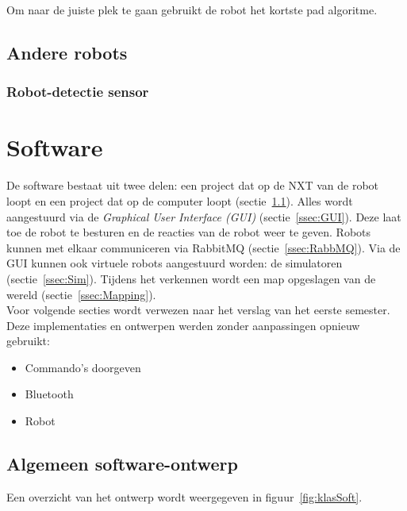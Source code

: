 \documentclass[tt3]{penoverslag}
\begin{document}
Om naar de juiste plek te gaan gebruikt de robot het kortste pad algoritme.

\subsection{Andere robots}
\subsubsection{Robot-detectie sensor}
\label{ssec:AlgoCollision}


\section{Software}
\label{sec:Softw}
De software bestaat uit twee delen: een project dat op de NXT van de robot loopt en een project dat op de computer loopt (sectie~\ref{ssec:Sdesign}). Alles wordt aangestuurd via de \textit{Graphical User Interface (GUI)} (sectie~\ref{ssec:GUI}). Deze laat toe de robot te besturen en de reacties van de robot weer te geven. Robots kunnen met elkaar communiceren via RabbitMQ (sectie~\ref{ssec:RabbMQ}). Via de GUI kunnen ook virtuele robots aangestuurd worden: de simulatoren (sectie~\ref{ssec:Sim}). Tijdens het verkennen wordt een map opgeslagen van de wereld (sectie~\ref{ssec:Mapping}).\\

Voor volgende secties wordt verwezen naar het verslag van het eerste semester. Deze implementaties en ontwerpen werden zonder aanpassingen opnieuw gebruikt:

\begin{itemize}
\item Commando's doorgeven
\item Bluetooth
\item Robot
\end{itemize}

\subsection{Algemeen software-ontwerp}
\label{ssec:Sdesign}
Een overzicht van het ontwerp wordt weergegeven in figuur~\ref{fig:klasSoft}.\\
\end{document}
